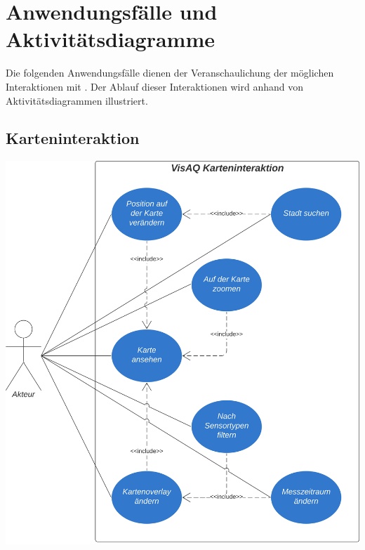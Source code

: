 \section{Anwendungsfälle und Aktivitätsdiagramme}
Die folgenden Anwendungsfälle dienen der Veranschaulichung der möglichen Interaktionen mit \softwarename . Der Ablauf dieser Interaktionen wird anhand von Aktivitätsdiagrammen illustriert.

\subsection{Karteninteraktion}

\begin{center}
\includegraphics[scale=0.16]{media/activity-usage/Karteninteraktion} 

\clearpage


\end{center}
